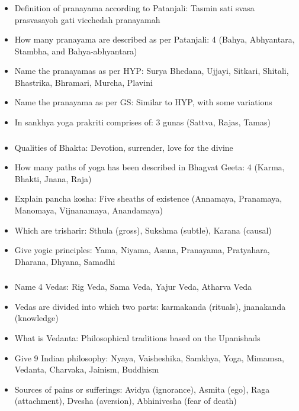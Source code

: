 \begin{frame}[fragile]\frametitle{}
\begin{itemize}
\item Definition of pranayama according to Patanjali: Tasmin sati svasa prasvasayoh gati vicchedah pranayamah
\item How many pranayama are described as per Patanjali: 4 (Bahya, Abhyantara, Stambha, and Bahya-abhyantara)
\item Name the pranayamas as per HYP: Surya Bhedana, Ujjayi, Sitkari, Shitali, Bhastrika, Bhramari, Murcha, Plavini
\item Name the pranayama as per GS: Similar to HYP, with some variations
\item In sankhya yoga prakriti comprises of: 3 gunas (Sattva, Rajas, Tamas)
\end{itemize}
\end{frame}

\begin{frame}[fragile]\frametitle{}
\begin{itemize}
\item Qualities of Bhakta: Devotion, surrender, love for the divine
\item How many paths of yoga has been described in Bhagvat Geeta: 4 (Karma, Bhakti, Jnana, Raja)
\item Explain pancha kosha: Five sheaths of existence (Annamaya, Pranamaya, Manomaya, Vijnanamaya, Anandamaya)
\item Which are trisharir: Sthula (gross), Sukshma (subtle), Karana (causal)
\item Give yogic principles: Yama, Niyama, Asana, Pranayama, Pratyahara, Dharana, Dhyana, Samadhi
\end{itemize}
\end{frame}

\begin{frame}[fragile]\frametitle{}
\begin{itemize}
\item Name 4 Vedas: Rig Veda, Sama Veda, Yajur Veda, Atharva Veda
\item Vedas are divided into which two parts: karmakanda (rituals), jnanakanda (knowledge)
\item What is Vedanta: Philosophical traditions based on the Upanishads
\item Give 9 Indian philosophy: Nyaya, Vaisheshika, Samkhya, Yoga, Mimamsa, Vedanta, Charvaka, Jainism, Buddhism
\item Sources of pains or sufferings: Avidya (ignorance), Asmita (ego), Raga (attachment), Dvesha (aversion), Abhinivesha (fear of death)
\end{itemize}
\end{frame}

